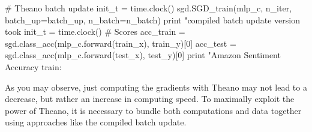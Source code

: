 \begin{exercise}
\begin{python}
# Theano batch update
init_t = time.clock()
sgd.SGD_train(mlp_c, n_iter, batch_up=batch_up, n_batch=n_batch)
print "\nTheano compiled batch update version took %
init_t = time.clock()
# Scores
acc_train = sgd.class_acc(mlp_c.forward(train_x), train_y)[0]
acc_test  = sgd.class_acc(mlp_c.forward(test_x), test_y)[0]
print "Amazon Sentiment Accuracy train: %
\end{python}
As you may observe, just computing the gradients with Theano may not lead to
a decrease, but rather an increase in computing speed. To maximally exploit
the power of Theano, it is necessary to bundle both computations and data 
together using approaches like the compiled batch update.
\end{exercise}

